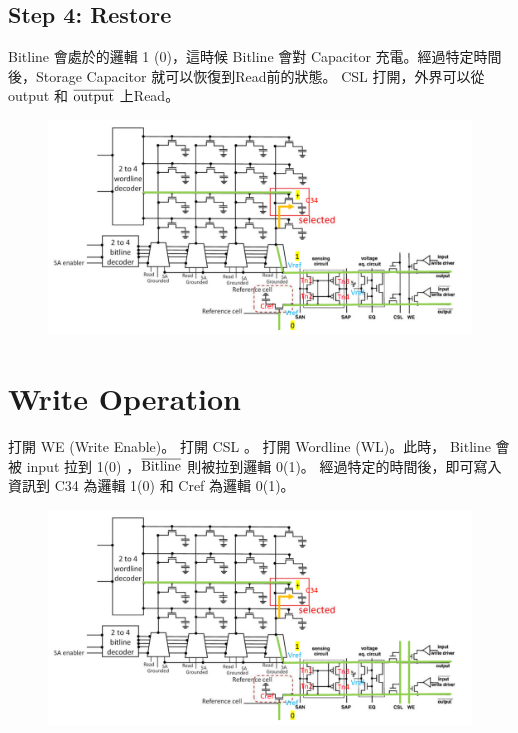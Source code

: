 \documentclass{article}
\begin{document}
\subsection*{Step 4: Restore}

Bitline 會處於的邏輯 1 (0)，這時候 Bitline 會對 Capacitor 充電。經過特定時間後，Storage Capacitor 就可以恢復到Read前的狀態。
CSL 打開，外界可以從 output 和 $\rm\overline{output}$ 上Read。

\begin{figure}[H]
\centering
\includegraphics[width = \linewidth]{./img/2023-12-24-16-31-40.png}
\end{figure}

\section{Write Operation}

打開 WE (Write Enable)。 打開 CSL 。 打開 Wordline (WL)。此時， Bitline 會被 input 拉到 1(0) ，$\rm\overline{Bitline}$ 則被拉到邏輯 0(1)。
經過特定的時間後，即可寫入資訊到 C34  為邏輯 1(0) 和 Cref 為邏輯 0(1)。

\begin{figure}[H]
  \centering
  \includegraphics[width = 0.95\linewidth]{./img/2023-12-24-16-33-47.png}
  \end{figure}
\end{document}
